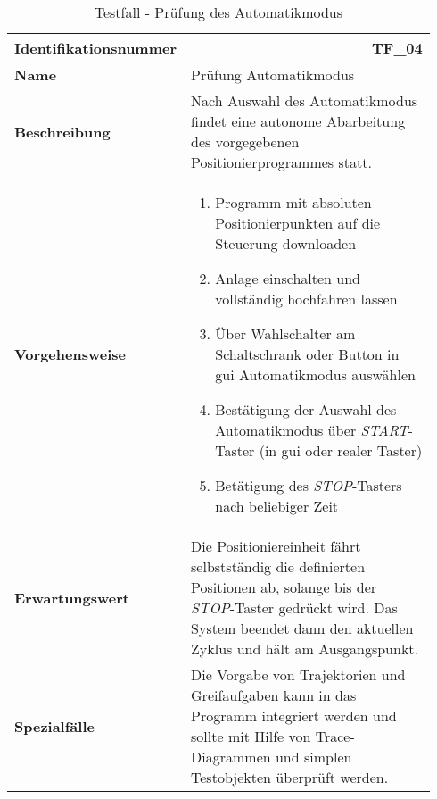 \documentclass[../../../Bachelorarbeit.tex]{subfiles}
\begin{document}
\begin{table}[H]
    \centering
    \begin{tabular}{ p{0.34\linewidth}  p{0.6\linewidth} }
        \hline
        \textbf{Identifikationsnummer}  & \multicolumn{1}{r}{TF\_04} \\ \hline
        \textbf{Name}                   & Prüfung Automatikmodus \\
        \textbf{Beschreibung}           & Nach Auswahl des Automatikmodus findet eine autonome Abarbeitung des vorgegebenen Positionierprogrammes statt. \\
        \textbf{Vorgehensweise}         &   {\begin{enumerate}[noitemsep,topsep=0pt,parsep=0pt,partopsep=0pt,leftmargin=*]
                                                \item Programm mit absoluten Positionierpunkten auf die Steuerung downloaden
                                                \item Anlage einschalten und vollständig hochfahren lassen
                                                \item Über Wahlschalter am Schaltschrank oder Button in \acs{gui} Automatikmodus auswählen
                                                \item Bestätigung der Auswahl des Automatikmodus über \textit{START}-Taster (in \acs{gui} oder realer Taster)
                                                \item Betätigung des \textit{STOP}-Tasters nach beliebiger Zeit
                                            \end{enumerate}} \\
        \textbf{Erwartungswert}         & Die Positioniereinheit fährt selbstständig die definierten Positionen ab, solange bis der \textit{STOP}-Taster gedrückt wird. Das System beendet dann den aktuellen Zyklus und hält am Ausgangspunkt. \\
        \textbf{Spezialfälle}           & Die Vorgabe von Trajektorien und Greifaufgaben kann in das Programm integriert werden und sollte mit Hilfe von Trace-Diagrammen und simplen Testobjekten überprüft werden. \\ \hline
    \end{tabular}
    \caption[\acs{tf} - Automatikmodus]{Testfall - Prüfung des Automatikmodus}
    \label{tab:my-table64}
\end{table}
\end{document}

